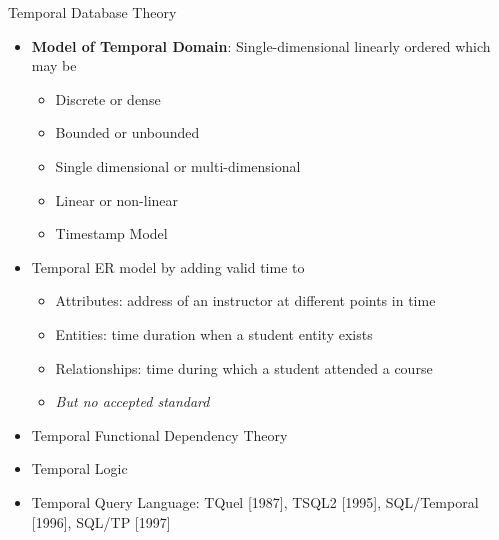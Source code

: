 \documentclass[aspectratio=169, xcolor=dvipsnames]{beamer}
\begin{document}
\begin{frame}{Temporal Database Theory}
    \begin{itemize}[<+->]
        \item \textbf{Model of Temporal Domain}: Single-dimensional linearly ordered which may be
        \begin{itemize}
            \item[$\triangleright$] Discrete or dense
            \item[$\triangleright$] Bounded or unbounded
            \item[$\triangleright$] Single dimensional or multi-dimensional
            \item[$\triangleright$] Linear or non-linear
            \item[$\triangleright$] Timestamp Model
        \end{itemize}
        \item Temporal ER model by adding valid time to
        \begin{itemize}
            \item[$\triangleright$] Attributes: address of an instructor at different points in time
            \item[$\triangleright$] Entities: time duration when a student entity exists
            \item[$\triangleright$] Relationships: time during which a student attended a course
            \item[$\triangleright$] \textit{But no accepted standard}
        \end{itemize}
        \item Temporal Functional Dependency Theory
        \item Temporal Logic
        \item Temporal Query Language: TQuel [1987], TSQL2 [1995], SQL/Temporal [1996], SQL/TP [1997]
    \end{itemize}
\end{frame}
\end{document}
